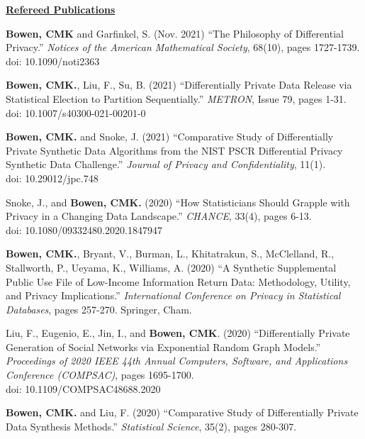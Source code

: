 \documentclass[11pt, letterpaper, roman]{moderncv} %
\begin{document}
\vspace{6pt}
\noindent\underline{\textbf{Refereed Publications}}
\vspace{4pt}
\begin{etaremune}[topsep=0pt, itemsep=4pt, partopsep=0pt, parsep=0pt]
    \item \textbf{Bowen, CMK} and Garfinkel, S. (Nov. 2021) ``The Philosophy of Differential Privacy.'' \textit{Notices of the American Mathematical Society}, 68(10), pages 1727-1739.\\
    doi: 10.1090/noti2363
    
    \item \textbf{Bowen, CMK.}, Liu, F., Su, B. (2021) ``Differentially Private Data Release via Statistical Election to Partition Sequentially.'' \textit{METRON}, Issue 79, pages 1-31.\\
    doi: 10.1007/s40300-021-00201-0
    
    \item \textbf{Bowen, CMK.} and Snoke, J. (2021) ``Comparative Study of Differentially Private Synthetic Data Algorithms from the NIST PSCR Differential Privacy Synthetic Data Challenge.'' \textit{Journal of Privacy and Confidentiality}, 11(1).\\
    doi: 10.29012/jpc.748
    
    \item Snoke, J., and \textbf{Bowen, CMK.} (2020) ``How Statisticians Should Grapple with Privacy in a Changing Data Landscape.'' \textit{CHANCE}, 33(4), pages 6-13.\\
    doi: 10.1080/09332480.2020.1847947
    
    \item \textbf{Bowen, CMK.}, Bryant, V., Burman, L., Khitatrakun, S., McClelland, R., Stallworth, P., Ueyama, K., Williams, A. (2020) ``A Synthetic Supplemental Public Use File of Low-Income Information Return Data: Methodology, Utility, and Privacy Implications.'' \textit{International Conference on Privacy in Statistical Databases}, pages 257-270. Springer, Cham.
    
    \item Liu, F., Eugenio, E., Jin, I., and \textbf{Bowen, CMK}. (2020) ``Differentially Private Generation of Social Networks via Exponential Random Graph Models.'' \textit{Proceedings of 2020 IEEE 44th Annual Computers, Software, and Applications Conference (COMPSAC)}, pages 1695-1700.\\
    doi: 10.1109/COMPSAC48688.2020

    \item \textbf{Bowen, CMK.} and Liu, F. (2020) ``Comparative Study of Differentially Private Data Synthesis Methods.'' \textit{Statistical Science}, 35(2), pages 280-307.


\end{etaremune}
\end{document}
